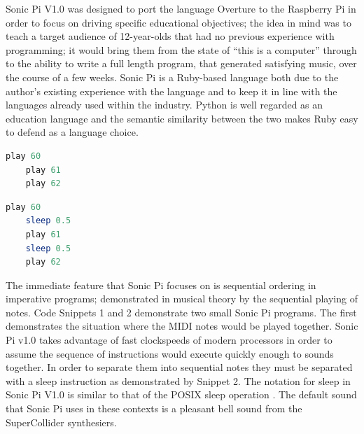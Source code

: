 \documentclass[11pt]{scrartcl}
\begin{document}
\begin{multicols}{2}
Sonic Pi V1.0 was designed to port the language Overture to the 
Raspberry Pi in order to focus on driving specific educational 
objectives; the idea in mind was to teach a target audience of 12-year-olds that 
had no previous experience with programming; it would bring them from the state 
of ``this is a computer'' through to the ability to write a full length program, 
that generated satisfying music, over the course of a few weeks. Sonic Pi is a Ruby-based language both due to the author's existing experience with 
the language and to keep it in line with the languages already used within the 
industry. Python is well regarded as an education language and the semantic similarity between the two makes Ruby easy to defend as a language choice.
\\

\begin{minipage}{0.5\textwidth}
	\begin{minipage}[t]{\textwidth}
		\begin{lstlisting}[language = ruby]
	play 60
	play 61
	play 62
		\end{lstlisting}
	\end{minipage}

	\begin{minipage}[t]{\textwidth}
		\begin{lstlisting}[language = ruby]
	play 60
	sleep 0.5
	play 61
	sleep 0.5
	play 62
		\end{lstlisting}
	\end{minipage}
\end{minipage}

\end{multicols}

The immediate feature that Sonic Pi focuses on is sequential ordering in 
imperative programs; demonstrated in musical theory by the sequential playing 
of notes. Code Snippets 1 and 2 demonstrate two small Sonic Pi programs. The 
first demonstrates the situation where the MIDI notes would be played together. 
Sonic Pi v1.0 takes advantage of fast clockspeeds of modern processors in order 
to assume the sequence of instructions would execute quickly enough 
to sounds together. In order to separate them into sequential notes they must 
be separated with a sleep instruction as demonstrated by Snippet 2. The notation 
for sleep in Sonic Pi V1.0 is similar to that of the POSIX sleep operation 
\cite{IG13}. The default sound that Sonic Pi uses in these contexts is a 
pleasant bell sound from the SuperCollider synthesiers.
\end{document}
